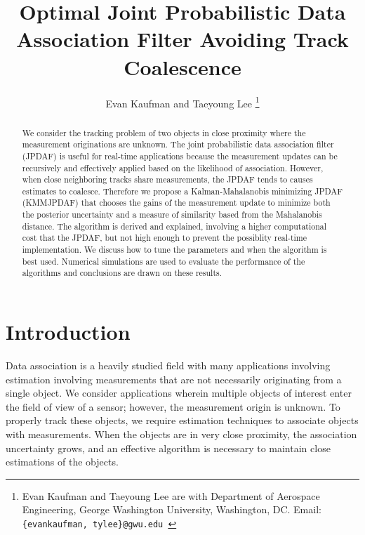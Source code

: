 \documentclass[letterpaper, 10pt, conference]{ieeeconf}
\title{\LARGE \bf
Optimal Joint Probabilistic Data Association Filter Avoiding Track Coalescence}
\author{Evan Kaufman and Taeyoung Lee
 \thanks{Evan Kaufman and Taeyoung Lee are with Department of Aerospace Engineering, George Washington University, Washington, DC. Email: {\tt\footnotesize \{evankaufman, tylee\}@gwu.edu }}
}
\begin{document}
\allowdisplaybreaks


\maketitle \thispagestyle{empty} \pagestyle{empty}

\begin{abstract}
We consider the tracking problem of two objects in close proximity where the measurement originations are unknown. The joint probabilistic data association filter (JPDAF) is useful for real-time applications because the measurement updates can be recursively and effectively applied based on the likelihood of association. However, when close neighboring tracks share measurements, the JPDAF tends to causes estimates to coalesce. Therefore we propose a Kalman-Mahalanobis minimizing JPDAF (KMMJPDAF) that chooses the gains of the measurement update to minimize both the posterior uncertainty and a measure of similarity based from the Mahalanobis distance. The algorithm is derived and explained, involving a higher computational cost that the JPDAF, but not high enough to prevent the possiblity real-time implementation. We discuss how to tune the parameters and when the algorithm is best used. Numerical simulations are used to evaluate the performance of the algorithms and conclusions are drawn on these results.
\end{abstract}


\section{Introduction}
Data association is a heavily studied field with many applications involving estimation involving measurements that are not necessarily originating from a single object.
We consider applications wherein multiple objects of interest enter the field of view of a sensor; however, the measurement origin is unknown.
To properly track these objects, we require estimation techniques to associate objects with measurements.
When the objects are in very close proximity, the association uncertainty grows, and an effective algorithm is necessary to maintain close estimations of the objects.
\end{document}
